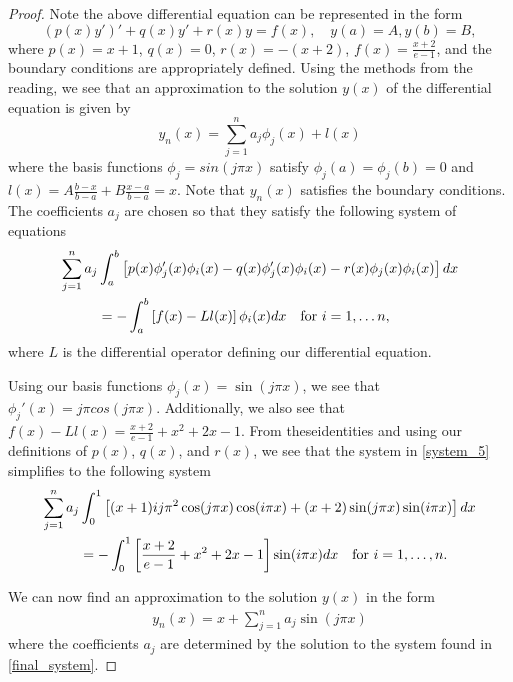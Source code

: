 \documentclass[12pt]{article}
\theoremstyle{definition}
\begin{document}
\begin{proof}
  Note the above differential equation can be represented in the form
  \[
    (p(x)y')' + q(x)y' +r(x)y = f(x), \quad y(a) = A, y(b) = B,
  \]
  where $p(x) = x+1$, $q(x) = 0$, $r(x)=-(x+2)$, $f(x)=\frac{x+2}{e-1}$, and the
  boundary conditions are appropriately defined. Using the methods from the reading,
  we see that an approximation to the solution $y(x)$ of the differential equation
  is given by
  \[
    y_n(x) = \sum_{j=1}^n a_j \phi_j(x) + l(x)
  \]
  where the basis functions $\phi_j = sin(j\pi x)$ satisfy $\phi_j(a) = \phi_j(b) = 0$
  and $l(x)= A \frac{b-x}{b-a} + B \frac{x-a}{b-a} = x$. Note that
  $y_n(x)$ satisfies the boundary conditions. The coefficients $a_j$ are chosen so that they
  satisfy the following system of equations
  \begin{align}\label{system_5}
    \sum_{j=1}^n a_j &\int_a^b\left[p(x)\phi_j'(x)\phi_i(x) -q(x)\phi_j'(x)\phi_i(x) -r(x)\phi_j(x)\phi_i(x)\right]dx \notag \\
    &= -\int_a^b \left[f(x) - Ll(x)\right]\phi_i(x)dx \quad \text{for $i=1,\dots n,$}
  \end{align}
  where $L$ is the differential operator defining our differential equation.

  Using our basis functions $\phi_j(x) = \sin(j\pi x)$, we see that $\phi_j'(x) = j\pi cos(j\pi x)$. Additionally,
  we also see that $f(x) - Ll(x) = \frac{x+2}{e-1} + x^2 +2x -1$. From theseidentities
  and using our definitions of $p(x)$, $q(x)$, and $r(x)$, we see that the system in \eqref{system_5}
  simplifies to the following system
  \begin{align}\label{final_system}
    \sum_{j=1}^n a_j &\int_0^1 \left[(x+1)ij\pi^2\cos(j\pi x)\cos(i \pi x) + (x+2)\sin(j \pi x)\sin(i \pi x)\right]dx \notag \\
    &= -\int_0^1 \left[\frac{x+2}{e-1} + x^2 + 2x -1\right]\sin(i\pi x)dx\quad \text{for $i=1,\dots,n$}.
  \end{align}

  We can now find an approximation to the solution $y(x)$ in the form
  \begin{align}\label{approx}
    y_n(x) = x + \sum_{j=1}^n a_j \sin(j \pi x)
  \end{align}
  where the coefficients $a_j$ are determined by the solution to the system found in \eqref{final_system}.


\end{proof}
\end{document}
